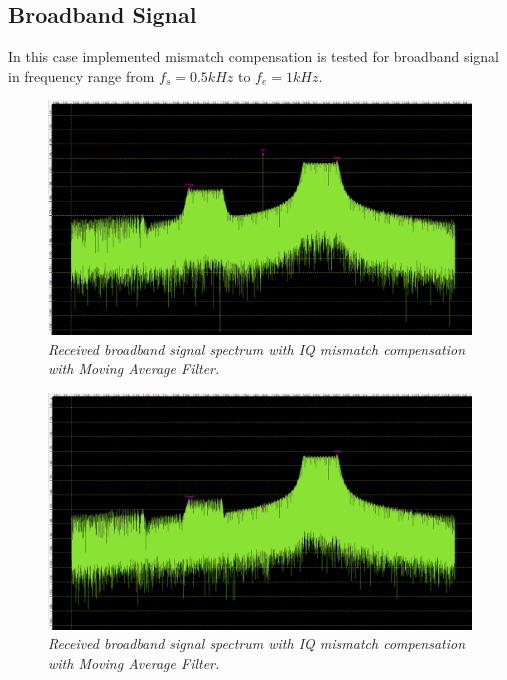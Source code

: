 \documentclass[en,printmode]{mgr}
\begin{document}
   		\newpage	
		\subsection*{Broadband Signal}
		In this case implemented mismatch compensation is tested for
		broadband signal in frequency range from $f_s=0.5kHz$ to $f_e=1kHz$.
		
		\begin{figure}[H]
    		\centering
   			\includegraphics[width=\textwidth]{plots/band_input.png}
   		 	\caption{\textit{Received broadband signal spectrum with IQ mismatch compensation with
   		 	Moving Average Filter.}}
   		\end{figure}
		\begin{figure}[H]
    		\centering
   			\includegraphics[width=\textwidth]{plots/my_band_mav.png}
   		 	\caption{\textit{Received broadband signal spectrum with IQ mismatch compensation with
   		 	Moving Average Filter.}}
   		\end{figure}
   		
\end{document}
